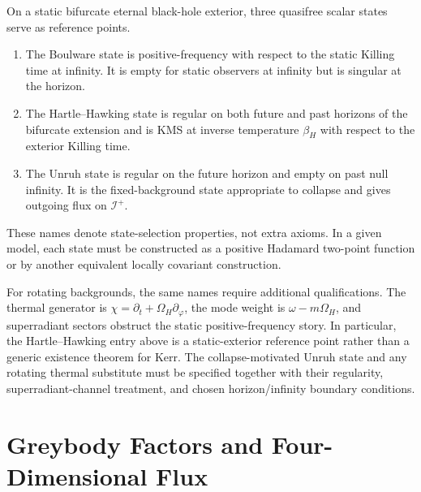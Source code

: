 On a static bifurcate eternal black-hole exterior, three quasifree scalar
states serve as reference points.
\begin{enumerate}[label=(\roman*)]
\item The Boulware state is positive-frequency with respect to the static
  Killing time at infinity.  It is empty for static observers at infinity but
  is singular at the horizon.
\item The Hartle--Hawking state is regular on both future and past horizons
  of the bifurcate extension and is KMS at inverse temperature
  \(\beta_H\) with respect to the exterior Killing time.
\item The Unruh state is regular on the future horizon and empty on past null
  infinity.  It is the fixed-background state appropriate to collapse and
  gives outgoing flux on \(\mathcal I^+\).
\end{enumerate}
These names denote state-selection properties, not extra axioms.  In a given
model, each state must be constructed as a positive Hadamard two-point
function or by another equivalent locally covariant construction.

For rotating backgrounds, the same names require additional qualifications.
The thermal generator is \(\chi=\partial_t+\Omega_H\partial_\varphi\), the
mode weight is \(\omega-m\Omega_H\), and superradiant sectors obstruct the
static positive-frequency story.  In particular, the Hartle--Hawking entry
above is a static-exterior reference point rather than a generic existence
theorem for Kerr.  The collapse-motivated Unruh state and any rotating thermal
substitute must be
specified together with their regularity, superradiant-channel treatment, and
chosen horizon/infinity boundary conditions.

\section{Greybody Factors and Four-Dimensional Flux}

